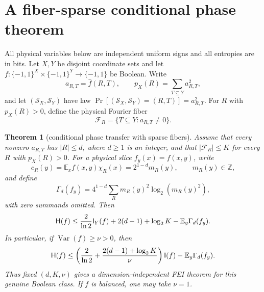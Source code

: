 \documentclass[11pt]{article}
\newtheorem{theorem}{Theorem}
\newcommand{\bits}{\{-1,1\}}
\newcommand{\HH}{\mathsf H}
\newcommand{\II}{\mathsf I}
\newcommand{\E}{\mathbb E}
\newcommand{\wh}[1]{\widehat{#1}}
\begin{document}
\section*{A fiber-sparse conditional phase theorem}

All physical variables below are independent uniform signs and all entropies are in bits.
Let $X,Y$ be disjoint coordinate sets and let
$f:\bits^X\times\bits^Y\to\bits$ be Boolean.  Write
\[
 a_{R,T}=\wh f(R,T),\qquad
 p_X(R)=\sum_{T\subseteq Y}a_{R,T}^2,
\]
and let $(\mathcal S_X,\mathcal S_Y)$ have law
$\Pr[(\mathcal S_X,\mathcal S_Y)=(R,T)]=a_{R,T}^2$.
For $R$ with $p_X(R)>0$, define the physical Fourier fiber
\[
 \mathcal F_R=\{T\subseteq Y:a_{R,T}\ne0\}.
\]

\begin{theorem}[conditional phase transfer with sparse fibers]\label{thm:main}
Assume that every nonzero $a_{R,T}$ has $|R|\le d$, where $d\ge1$ is an integer,
and that $|\mathcal F_R|\le K$ for every $R$ with $p_X(R)>0$.
For a physical slice $f_y(x)=f(x,y)$, write
\[
 c_R(y)=\E_x f(x,y)\chi_R(x)=2^{1-d}m_R(y),\qquad m_R(y)\in\mathbb Z,
\]
and define
\[
 \Gamma_d(f_y)=4^{1-d}\sum_R m_R(y)^2\log_2(m_R(y)^2),
\]
with zero summands omitted. Then
\begin{equation}\label{eq:main}
 \HH(f)\le {2\over\ln2}\II_Y(f)+2(d-1)+\log_2K
          -\E_y\Gamma_d(f_y).
\end{equation}
In particular, if $\operatorname{Var}(f)\ge\nu>0$, then
\begin{equation}\label{eq:fei}
 \HH(f)\le
 \left({2\over\ln2}+{2(d-1)+\log_2K\over\nu}\right)\II(f)
 -\E_y\Gamma_d(f_y).
\end{equation}
Thus fixed $(d,K,\nu)$ gives a dimension-independent FEI theorem for this genuine
Boolean class.  If $f$ is balanced, one may take $\nu=1$.
\end{theorem}
\end{document}
